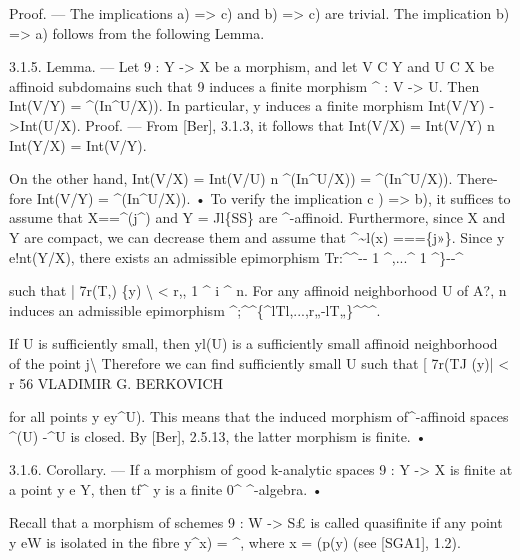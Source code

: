 \documentclass[
  10pt,
]{article}
\newenvironment{Shaded}{}{}
\newcommand{\NormalTok}[1]{#1}
\begin{document}
\begin{Shaded}
\begin{Highlighting}[]
\NormalTok{      Proof. — The implications a) =\textgreater{} c) and b) =\textgreater{} c) are trivial. The implication}
\NormalTok{b) =\textgreater{} a) follows from the following Lemma.}

\NormalTok{      3.1.5. Lemma. — Let 9 : Y {-}\textgreater{} X be a morphism, and let V C Y and U C X be affinoid}
\NormalTok{subdomains such that 9 induces a finite morphism \^{} : V {-}\textgreater{} U. Then Int(V/Y) = \^{}(In\^{}U/X)).}
\NormalTok{In particular, y induces a finite morphism Int(V/Y) {-}\textgreater{}Int(U/X).}
\NormalTok{      Proof. — From [Ber], 3.1.3, it follows that}
\NormalTok{                  Int(V/X) = Int(V/Y) n Int(Y/X) = Int(V/Y).}

\NormalTok{On the other hand, Int(V/X) = Int(V/U) n \^{}(In\^{}U/X)) = \^{}(In\^{}U/X)). There{-}}
\NormalTok{fore Int(V/Y) = \^{}(In\^{}U/X)). •}
\NormalTok{     To verify the implication c ) =\textgreater{} b), it suffices to assume that X==\^{}(j\^{}) and}
\NormalTok{Y = Jl\{SS\} are \^{}{-}affinoid. Furthermore, since X and Y are compact, we can decrease}
\NormalTok{them and assume that \^{}\textasciitilde{}l(x) ===\{j»\}. Since y e!nt(Y/X), there exists an admissible}
\NormalTok{epimorphism}
\NormalTok{                  Tr:\^{}\^{}{-}{-} 1 \^{},...\^{} 1 \^{}\}{-}{-}\^{}}

\NormalTok{such that | 7r(T,) \{y) \textbackslash{} \textless{} r,, 1 \^{} i \^{} n. For any affinoid neighborhood U of A?, n induces}
\NormalTok{an admissible epimorphism}
\NormalTok{                  \^{};\^{}\^{}\{\^{}lTl,...,r„{-}lT„\}\^{}\^{}\^{}.}

\NormalTok{      If U is sufficiently small, then y\textquotesingle{}\textquotesingle{}l(U) is a sufficiently small affinoid neighborhood}
\NormalTok{of the point j\textbackslash{} Therefore we can find sufficiently small U such that [ 7r(TJ (y)| \textless{} r}
\NormalTok{56                                VLADIMIR G. BERKOVICH}

\NormalTok{for all points y \textquotesingle{} ey\^{}U). This means that the induced morphism of\^{}{-}affinoid spaces}
\NormalTok{\^{}(U) {-}\^{}U is closed. By [Ber], 2.5.13, the latter morphism is finite. •}

\NormalTok{      3.1.6. Corollary. — If a morphism of good k{-}analytic spaces 9 : Y {-}\textgreater{} X is finite at a point}
\NormalTok{y e Y, then tf\^{} y is a finite 0\^{} \^{}{-}algebra. •}

\NormalTok{    Recall that a morphism of schemes 9 : W {-}\textgreater{} S£ is called quasifinite if any point}
\NormalTok{y eW is isolated in the fibre y\textquotesingle{}\^{}x) = \^{}, where x = (p(y) (see [SGA1], 1.2).}


\end{Highlighting}
\end{Shaded}
\end{document}

